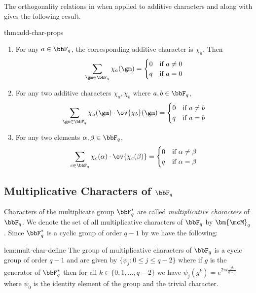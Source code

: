 The orthogonality relations in  when applied to additive characters and along with  gives the following result.
\begin{Theorem}{}{thm:add-char-props}
  \begin{enumerate}[label=(\roman*)]
    \item For any $a\in\bbF_q$, the corresponding additive character is $\chi_a$. Then $$\sum_{\gm\in\bbF_q}\chi_a(\gm)=\begin{cases}
              0 & \text{if $a\neq 0$} \\
              q & \text{if $a=0$}
            \end{cases}$$
    \item For any two additive characters $\chi_{a},\chi_{b}$ where $a,b\in\bbF_q$, $$\sum_{\gm\in\bbF_q}\chi_{a}(\gm)\cdot \ov{\chi_{b}}(\gm)=\begin{cases}
              0 & \text{if $a\neq b$} \\
              q & \text{if $a=b$}
            \end{cases}$$
    \item For any two elements $\alpha,\beta\in\bbF_q$, $$\sum_{c\in\bbF_q}\chi_c(\alpha)\cdot\ov{\chi_c(\beta)}=\begin{cases}
              0 & \text{if $\alpha\neq \beta$} \\
              q & \text{if $\alpha=\beta$}
            \end{cases}$$
  \end{enumerate}
\end{Theorem}

\subsection{Multiplicative Characters of \texorpdfstring{$\bbF_q$}{Fq}}\label{sec:mult-char}
Characters of the multiplicate group $\bbF_q^*$ are called \emph{multiplicative characters} of $\bbF_q$. We denote the set of all multiplicative characters of $\bbF_q$ by $\bm{\mcM}_q$. Since $\bbF_q^*$ is a cyclic group of order $q-1$ by  we have the following:
\begin{lemma}{}{lem:mult-char-define}
  The group of multiplicative characters of $\bbF_q$ is a cycic group of order $q-1$ and are given by $\{\psi_j\colon 0\leq j\leq q-2\}$ where if $g$ is the generator of $\bbF_q^*$ then for all $k\in\{0,1,\dots, q-2\}$ we have $\psi_j(g^k)=e^{2\pi i\frac{jk}{q-1}}$ where $\psi_0$ is the identity element of the group and the trivial character.
\end{lemma}


